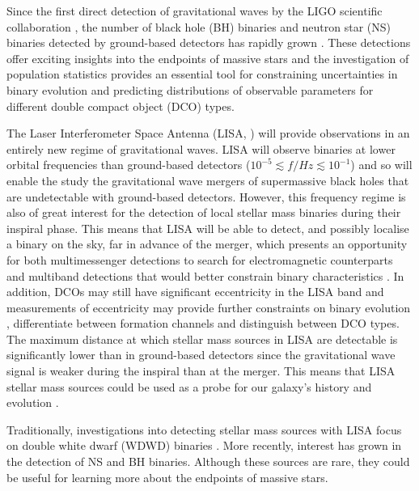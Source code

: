 Since the first direct detection of gravitational waves by the LIGO scientific collaboration \citep{Abbott+2016_first_detection}, the number of black hole (BH) binaries and neutron star (NS) binaries detected by ground-based detectors has rapidly grown \citep{Abbott+2019_GWTC1,Abbott+2020_GWTC2}. These detections offer exciting insights into the endpoints of massive stars and the investigation of population statistics provides an essential tool for constraining uncertainties in binary evolution and predicting distributions of observable parameters for different double compact object (DCO) types. 

The Laser Interferometer Space Antenna (LISA, \citealp{Amaro-Seoane+2017}) will provide observations in an entirely new regime of gravitational waves. LISA will observe binaries at lower orbital frequencies than ground-based detectors ($10^{-5} \lesssim f / \unit{Hz} \lesssim 10^{-1}$) and so will enable the study the gravitational wave mergers of supermassive black holes that are undetectable with ground-based detectors. However, this frequency regime is also of great interest for the detection of local stellar mass binaries during their inspiral phase. This means that LISA will be able to detect, and possibly localise a binary on the sky, far in advance of the merger, which presents an opportunity for both multimessenger detections to search for electromagnetic counterparts and multiband detections that would better constrain binary characteristics \citep[e.g.][]{Sesana+2016, Gerosa+2019}. In addition, DCOs may still have significant eccentricity in the LISA band and measurements of eccentricity may provide further constraints on binary evolution \citep[e.g.][]{Nelemans+2001, Breivik+2016, Antonini+2017, Rodriguez+2018}, differentiate between formation channels and distinguish between DCO types. The maximum distance at which stellar mass sources in LISA are detectable is significantly lower than in ground-based detectors since the gravitational wave signal is weaker during the inspiral than at the merger. This means that LISA stellar mass sources could be used as a probe for our galaxy's history and evolution \citep[e.g.][]{Korol+2019}.

Traditionally, investigations into detecting stellar mass sources with LISA focus on double white dwarf (WDWD) binaries \citep{Nelemans+2001,Ruiter+2010,Yu+2010,Nissanke+2012,Korol+2017,Lamberts+2018}. More recently, interest has grown in the detection of NS and BH binaries. Although these sources are rare, they could be useful for learning more about the endpoints of massive stars.

